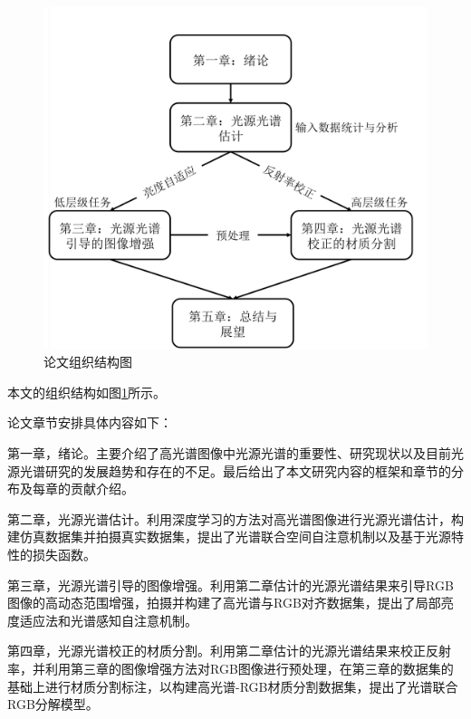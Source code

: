 \documentclass[
    type = master, %
    degree = academic,        %
    decl-page,  %
  ]{njuthesis}
\begin{document}
\begin{figure}[h]
	\begin{center}
		\includegraphics[width=1.0\linewidth]{docs/fig-chap1/fig-1-structure.pdf}
	\end{center}
	\caption{论文组织结构图}
	\label{fig:structure}
\end{figure}

本文的组织结构如图\ref{fig:structure}所示。

论文章节安排具体内容如下：

第一章，绪论。主要介绍了高光谱图像中光源光谱的重要性、研究现状以及目前光源光谱研究的发展趋势和存在的不足。最后给出了本文研究内容的框架和章节的分布及每章的贡献介绍。  

第二章，光源光谱估计。利用深度学习的方法对高光谱图像进行光源光谱估计，构建仿真数据集并拍摄真实数据集，提出了光谱联合空间自注意机制以及基于光源特性的损失函数。

第三章，光源光谱引导的图像增强。利用第二章估计的光源光谱结果来引导RGB图像的高动态范围增强，拍摄并构建了高光谱与RGB对齐数据集，提出了局部亮度适应法和光谱感知自注意机制。

第四章，光源光谱校正的材质分割。利用第二章估计的光源光谱结果来校正反射率，并利用第三章的图像增强方法对RGB图像进行预处理，在第三章的数据集的基础上进行材质分割标注，以构建高光谱-RGB材质分割数据集，提出了光谱联合RGB分解模型。
\end{document}
